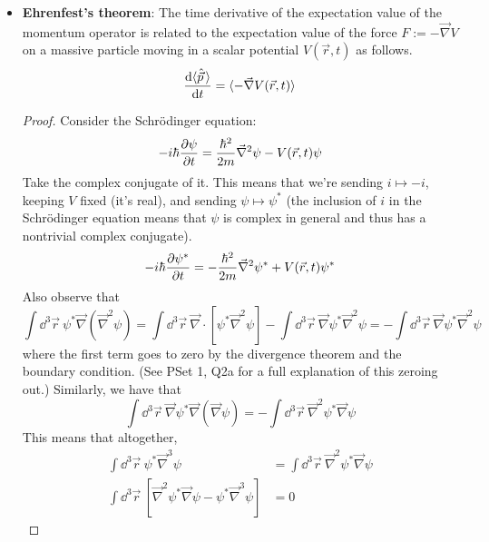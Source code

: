\documentclass[../notes.tex]{subfiles}
\begin{document}
\begin{itemize}
    \item \textbf{Ehrenfest's theorem}: The time derivative of the expectation value of the momentum operator is related to the expectation value of the force $F:=-\vec{\nabla}V$ on a massive particle moving in a scalar potential $V(\vec{r},t)$ as follows.
    \begin{equation*}
        \dv{\langle{\hat{\vec{p}}\,}\rangle}{t} = \langle{-\vec{\nabla}V(\vec{r},t)}\rangle
    \end{equation*}
    \begin{proof}
        Consider the Schr\"{o}dinger equation:
        \begin{equation*}
            -i\hbar\pdv{\psi}{t} = \frac{\hbar^2}{2m}\vec{\nabla}^2\psi-V(\vec{r},t)\psi
        \end{equation*}
        Take the complex conjugate of it. This means that we're sending $i\mapsto -i$, keeping $V$ fixed (it's real), and sending $\psi\mapsto\psi^*$ (the inclusion of $i$ in the Schr\"{o}dinger equation means that $\psi$ is complex in general and thus has a nontrivial complex conjugate).
        \begin{equation*}
            -i\hbar\pdv{\psi^*}{t} = -\frac{\hbar^2}{2m}\vec{\nabla}^2\psi^*+V(\vec{r},t)\psi^*
        \end{equation*}
        Also observe that
        \begin{equation*}
            \int\dd^3\vec{r}\ \psi^*\vec{\nabla}(\vec{\nabla}^2\psi) = \int\dd^3\vec{r}\ \vec{\nabla}\cdot[\psi^*\vec{\nabla}^2\psi]-\int\dd^3\vec{r}\ \vec{\nabla}\psi^*\vec{\nabla}^2\psi
            = -\int\dd^3\vec{r}\ \vec{\nabla}\psi^*\vec{\nabla}^2\psi
        \end{equation*}
        where the first term goes to zero by the divergence theorem and the boundary condition. (See PSet 1, Q2a for a full explanation of this zeroing out.) Similarly, we have that
        \begin{equation*}
            \int\dd^3\vec{r}\ \vec{\nabla}\psi^*\vec{\nabla}(\vec{\nabla}\psi) = -\int\dd^3\vec{r}\ \vec{\nabla}^2\psi^*\vec{\nabla}\psi
        \end{equation*}
        This means that altogether,
        \begin{align*}
            \int\dd^3\vec{r}\ \psi^*\vec{\nabla}^3\psi &= \int\dd^3\vec{r}\ \vec{\nabla}^2\psi^*\vec{\nabla}\psi\\
            \int\dd^3\vec{r}\ [\vec{\nabla}^2\psi^*\vec{\nabla}\psi-\psi^*\vec{\nabla}^3\psi] &= 0
        \end{align*}

\end{proof}
\end{itemize}
\end{document}
